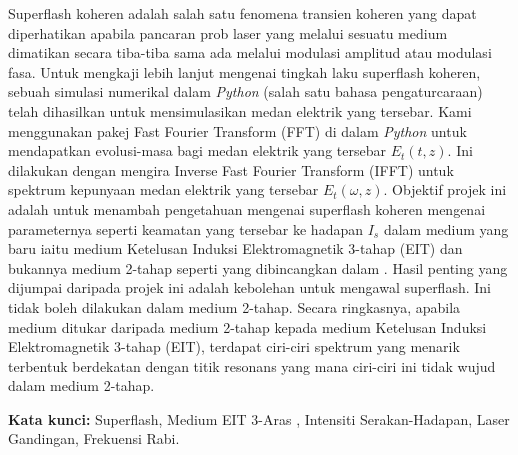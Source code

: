
Superflash koheren adalah salah satu fenomena transien koheren yang dapat diperhatikan apabila pancaran prob laser yang melalui sesuatu medium dimatikan secara tiba-tiba sama ada melalui modulasi amplitud atau modulasi fasa. Untuk mengkaji lebih lanjut mengenai tingkah laku superflash koheren, sebuah simulasi numerikal dalam \textit{Python} (salah satu bahasa pengaturcaraan) telah dihasilkan untuk mensimulasikan medan elektrik yang tersebar. Kami menggunakan pakej Fast Fourier Transform (FFT) di dalam \textit{Python} untuk mendapatkan evolusi-masa bagi medan elektrik yang tersebar $E_{t}(t, z)$. Ini dilakukan dengan mengira Inverse Fast Fourier Transform (IFFT) untuk spektrum kepunyaan medan elektrik yang tersebar $E_{t}(\omega, z)$. Objektif projek ini adalah untuk menambah pengetahuan mengenai superflash koheren mengenai parameternya seperti keamatan yang tersebar ke hadapan $I_{s}$ dalam medium yang baru iaitu medium Ketelusan Induksi Elektromagnetik 3-tahap (EIT) dan bukannya medium 2-tahap seperti yang dibincangkan dalam \cite{Kwong2014}. Hasil penting yang dijumpai daripada projek ini adalah kebolehan untuk mengawal superflash. Ini tidak boleh dilakukan dalam medium 2-tahap. Secara ringkasnya, apabila medium ditukar daripada medium 2-tahap kepada medium Ketelusan Induksi Elektromagnetik 3-tahap (EIT), terdapat ciri-ciri spektrum yang menarik terbentuk berdekatan dengan titik resonans yang mana ciri-ciri ini tidak wujud dalam medium 2-tahap.

\textbf{Kata kunci:} Superflash, Medium EIT 3-Aras , Intensiti Serakan-Hadapan, Laser Gandingan, Frekuensi Rabi.
